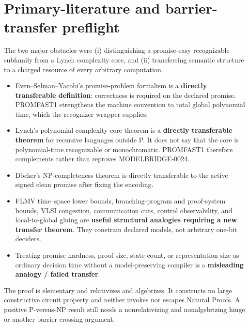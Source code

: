 \documentclass[11pt]{article}
\begin{document}
\section{Primary-literature and barrier-transfer preflight}
The two major obstacles were (i) distinguishing a promise-easy recognizable
subfamily from a Lynch complexity core, and (ii) transferring semantic
structure to a charged resource of every arbitrary computation.
\begin{itemize}[leftmargin=*]
\item Even--Selman--Yacobi's promise-problem formalism is a
\textbf{directly transferable definition}: correctness is required on the
declared promise.  PROMFAST1 strengthens the machine convention to total
global polynomial time, which the recognizer wrapper supplies.
\item Lynch's polynomial-complexity-core theorem is a \textbf{directly
transferable theorem} for recursive languages outside P.  It does not say
that the core is polynomial-time recognizable or monochromatic.  PROMFAST1
therefore complements rather than reproves MODELBRIDGE-0024.
\item D\"ocker's NP-completeness theorem is directly transferable to the
active signed clean promise after fixing the encoding.
\item FLMV time--space lower bounds, branching-program and proof-system
bounds, VLSI congestion, communication cuts, control observability, and
local-to-global gluing are \textbf{useful structural analogies requiring a
new transfer theorem}.  They constrain declared models, not arbitrary
one-bit deciders.
\item Treating promise hardness, proof size, state count, or representation
size as ordinary decision time without a model-preserving compiler is a
\textbf{misleading analogy / failed transfer}.
\end{itemize}

The proof is elementary and relativizes and algebrizes.  It constructs no
large constructive circuit property and neither invokes nor escapes Natural
Proofs.  A positive P-versus-NP result still needs a nonrelativizing and
nonalgebrizing hinge or another barrier-crossing argument.
\end{document}
